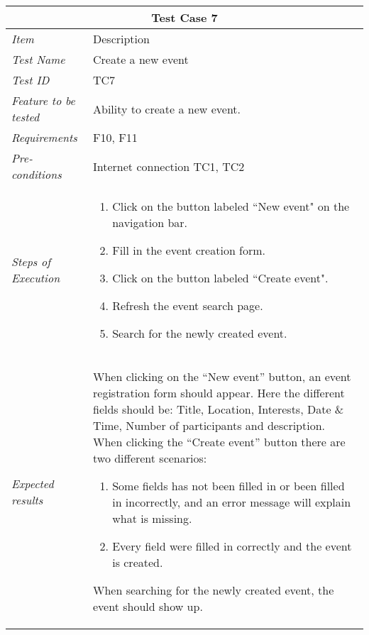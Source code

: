 \begin{minipage}{\linewidth}
\setlength{\tabcolsep}{15pt}
\centering
{}
\begin{tabular}{ |l|p{70mm}| }
	\hline
	\multicolumn{2}{|c|}{\cellcolor{gray!25} \textbf{Test Case 7}} \\
	\hline
	\it{\cellcolor{gray!25}Item} & {\cellcolor{gray!25} Description } \\
	\hline
	\it{\cellcolor{gray!25}Test Name } & Create a new event \\ \hline
	\it{\cellcolor{gray!25}Test ID} & TC7 \\ \hline
	\it{\cellcolor{gray!25}Feature to be tested} & Ability to create a new event. \\ \hline
	\it{\cellcolor{gray!25}Requirements} & F10, F11  \\ \hline
	\it{\cellcolor{gray!25}Pre-conditions} & Internet connection TC1, TC2  \\ \hline
	\it{\cellcolor{gray!25}Steps of Execution} & \begin{enumerate}
	                                       \item Click on the button labeled ``New event" on the navigation bar.
	                                       \item Fill in the event creation form.
	                                       \item Click on the button labeled ``Create event".
	                                       \item Refresh the event search page.
	                                       \item Search for the newly created event.
	                                     \end{enumerate} \\ \hline
	\it{\cellcolor{gray!25}Expected results} & When clicking on the ``New event'' button, an event registration form should appear. Here the different fields should be: Title, Location, Interests, Date \& Time, Number of participants and description. When clicking the ``Create event'' button there are two different scenarios:
	\begin{enumerate}[label=\alph*)]
	                                       \item Some fields has not been filled in or been filled in incorrectly, and an error message will explain what is missing.
	                                       \item Every field were filled in correctly and the event is created.
	                                     \end{enumerate} 
	                                     When searching for the newly created event, the event should show up. \\
	\hline
\end{tabular}
\medskip
\end{minipage}
